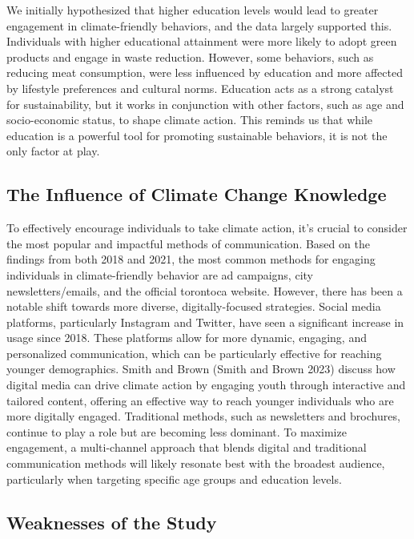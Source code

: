 \documentclass[
  letterpaper,
  DIV=11,
  numbers=noendperiod]{scrartcl}
\begin{document}
We initially hypothesized that higher education levels would lead to
greater engagement in climate-friendly behaviors, and the data largely
supported this. Individuals with higher educational attainment were more
likely to adopt green products and engage in waste reduction. However,
some behaviors, such as reducing meat consumption, were less influenced
by education and more affected by lifestyle preferences and cultural
norms. Education acts as a strong catalyst for sustainability, but it
works in conjunction with other factors, such as age and socio-economic
status, to shape climate action. This reminds us that while education is
a powerful tool for promoting sustainable behaviors, it is not the only
factor at play.

\subsection{The Influence of Climate Change
Knowledge}\label{sec-third-point}

To effectively encourage individuals to take climate action, it's
crucial to consider the most popular and impactful methods of
communication. Based on the findings from both 2018 and 2021, the most
common methods for engaging individuals in climate-friendly behavior are
ad campaigns, city newsletters/emails, and the official torontoca
website. However, there has been a notable shift towards more diverse,
digitally-focused strategies. Social media platforms, particularly
Instagram and Twitter, have seen a significant increase in usage since
2018. These platforms allow for more dynamic, engaging, and personalized
communication, which can be particularly effective for reaching younger
demographics. Smith and Brown (Smith and Brown 2023) discuss how digital
media can drive climate action by engaging youth through interactive and
tailored content, offering an effective way to reach younger individuals
who are more digitally engaged. Traditional methods, such as newsletters
and brochures, continue to play a role but are becoming less dominant.
To maximize engagement, a multi-channel approach that blends digital and
traditional communication methods will likely resonate best with the
broadest audience, particularly when targeting specific age groups and
education levels.

\subsection{Weaknesses of the Study}\label{weaknesses-of-the-study}
\end{document}
